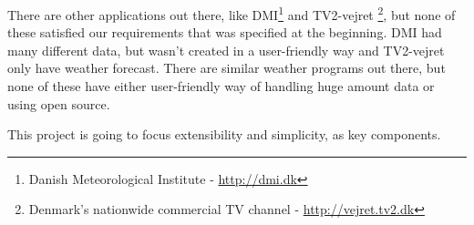 There are other applications out there, like DMI\footnote{Danish Meteorological Institute - \url{http://dmi.dk}} and TV2-vejret \footnote{Denmark's nationwide commercial TV channel - \url{http://vejret.tv2.dk}}, but none of these satisfied our requirements that was specified at the beginning. DMI had many different data, but wasn't created in a user-friendly way and TV2-vejret only have weather forecast. There are similar weather programs out there, but none of these have either user-friendly way of handling huge amount data or using open source.

This project is going to focus extensibility and simplicity, as key components.

